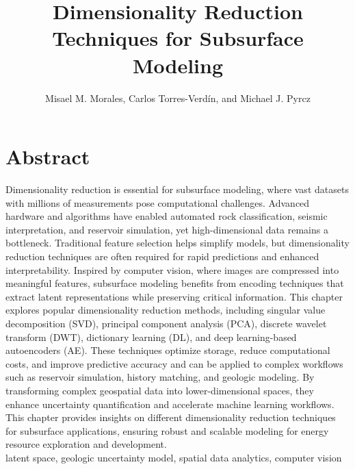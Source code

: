 \documentclass[a4paper,fleqn,12pt]{article}
\title{Dimensionality Reduction Techniques for Subsurface Modeling}
\author{Misael M. Morales, Carlos Torres-Verd\'{i}n, and Michael J. Pyrcz}
\begin{document}
\newcommand*{\vertbar}{\rule[-1ex]{0.5pt}{2.5ex}}
\maketitle
\linenumbers

\section*{Abstract}
Dimensionality reduction is essential for subsurface modeling, where vast datasets with millions of measurements pose computational challenges. Advanced hardware and algorithms have enabled automated rock classification, seismic interpretation, and reservoir simulation, yet high-dimensional data remains a bottleneck. Traditional feature selection helps simplify models, but dimensionality reduction techniques are often required for rapid predictions and enhanced interpretability. Inspired by computer vision, where images are compressed into meaningful features, subsurface modeling benefits from encoding techniques that extract latent representations while preserving critical information. This chapter explores popular dimensionality reduction methods, including singular value decomposition (SVD), principal component analysis (PCA), discrete wavelet transform (DWT), dictionary learning (DL), and deep learning-based autoencoders (AE). These techniques optimize storage, reduce computational costs, and improve predictive accuracy and can be applied to complex workflows such as reservoir simulation, history matching, and geologic modeling. By transforming complex geospatial data into lower-dimensional spaces, they enhance uncertainty quantification and accelerate machine learning workflows. This chapter provides insights on different dimensionality reduction techniques for subsurface applications, ensuring robust and scalable modeling for energy resource exploration and development.\\

 latent space, geologic uncertainty model, spatial data analytics, computer vision

\end{document}
